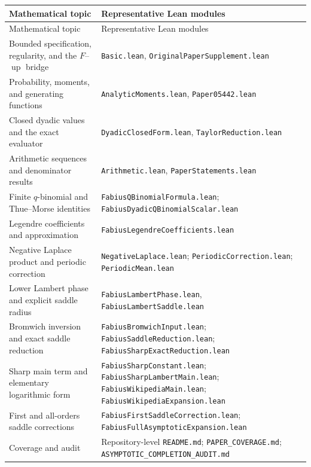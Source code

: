 \documentclass[11pt,oneside]{article}
\theoremstyle{definition}
\theoremstyle{remark}
\newcommand{\upf}{\operatorname{up}}
\begin{document}
\footnotesize
\begin{longtable}{>{\raggedright\arraybackslash}p{}>{\raggedright\arraybackslash}p{}}
\toprule
Mathematical topic & Representative Lean modules\\
\midrule
\endfirsthead
\toprule
Mathematical topic & Representative Lean modules\\
\midrule
\endhead
Bounded specification, regularity, and the $F$--$\upf$ bridge &
\texttt{Basic.lean}, \texttt{OriginalPaperSupplement.lean}\\
Probability, moments, and generating functions &
\texttt{AnalyticMoments.lean}, \texttt{Paper05442.lean}\\
Closed dyadic values and the exact evaluator &
\texttt{DyadicClosedForm.lean}, \texttt{TaylorReduction.lean}\\
Arithmetic sequences and denominator results &
\texttt{Arithmetic.lean}, \texttt{PaperStatements.lean}\\
Finite $q$-binomial and Thue--Morse identities &
\texttt{FabiusQBinomialFormula.lean};\newline
\texttt{FabiusDyadicQBinomialScalar.lean}\\
Legendre coefficients and approximation &
\texttt{FabiusLegendreCoefficients.lean}\\
Negative Laplace product and periodic correction &
\texttt{NegativeLaplace.lean}; \texttt{PeriodicCorrection.lean};\newline
\texttt{PeriodicMean.lean}\\
Lower Lambert phase and explicit saddle radius &
\texttt{FabiusLambertPhase.lean}, \texttt{FabiusLambertSaddle.lean}\\
Bromwich inversion and exact saddle reduction &
\texttt{FabiusBromwichInput.lean}; \texttt{FabiusSaddleReduction.lean};\newline
\texttt{FabiusSharpExactReduction.lean}\\
Sharp main term and elementary logarithmic form &
\texttt{FabiusSharpConstant.lean}; \texttt{FabiusSharpLambertMain.lean};\newline
\texttt{FabiusWikipediaMain.lean}; \texttt{FabiusWikipediaExpansion.lean}\\
First and all-orders saddle corrections &
\texttt{FabiusFirstSaddleCorrection.lean};\newline
\texttt{FabiusFullAsymptoticExpansion.lean}\\
Coverage and audit &
Repository-level \texttt{README.md}; \texttt{PAPER\_COVERAGE.md};\newline
\texttt{ASYMPTOTIC\_COMPLETION\_AUDIT.md}\\
\bottomrule
\end{longtable}
\normalsize
\end{document}
